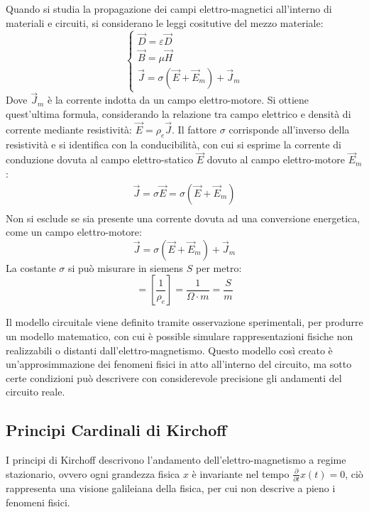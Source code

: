 \documentclass{article}
\numberwithin{equation}{subsection}
\begin{document}
Quando si studia la propagazione dei campi elettro-magnetici all'interno di materiali e circuiti, si considerano le leggi cositutive del mezzo materiale:
\begin{equation}
    \begin{cases}
        \vec{D}=\varepsilon\vec{D}\\
        \vec{B}=\mu\vec{H}\\
        \vec{J}=\sigma(\vec{E}+\vec{E}_m)+\vec{J}_m
    \end{cases}
\end{equation}
Dove $\vec{J}_m$ è la corrente indotta da un campo elettro-motore. Si ottiene quest'ultima formula, considerando la relazione tra campo elettrico e densità di corrente mediante 
resistività: $\vec{E}=\rho_e\vec{J}$. Il fattore $\sigma$ corrisponde all'inverso della resistività e si identifica con la conducibilità, con cui si esprime la corrente di conduzione dovuta al campo elettro-statico 
$\vec{E}$ dovuto al campo elettro-motore $\vec{E}_m$:  
\begin{gather*}
    \vec{J}=\sigma\vec{E}=\sigma(\vec{E}+\vec{E}_m)\\
\end{gather*}
Non si esclude se sia presente una corrente dovuta ad una conversione energetica, come un campo elettro-motore:
\begin{equation*}
    \vec{J}=\sigma(\vec{E}+\vec{E}_m)+\vec{J}_m
\end{equation*}
La costante $\sigma$ si può misurare in siemens $S$ per metro:
\begin{equation*}
    [\sigma]=\displaystyle\left[\frac{1}{\rho_e}\right]=\frac{1}{\Omega\cdot m}=\frac{S}{m}
\end{equation*}

Il modello circuitale viene definito tramite osservazione sperimentali, per produrre un modello matematico, con cui è possible simulare rappresentazioni fisiche non realizzabili 
o distanti dall'elettro-magnetismo. Questo modello così creato è un'approsimmazione dei fenomeni fisici in atto all'interno del circuito, ma sotto certe condizioni può 
descrivere con considerevole precisione gli andamenti del circuito reale. 

\subsection{Principi Cardinali di Kirchoff}

I principi di Kirchoff descrivono l'andamento dell'elettro-magnetismo a regime stazionario, ovvero ogni grandezza fisica $x$ è invariante nel tempo
$\displaystyle\frac{\partial }{\partial t}x(t)=0$, ciò rappresenta una visione galileiana della fisica, per cui non descrive a pieno i fenomeni fisici. 
\end{document}
